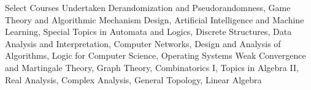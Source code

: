 \begin{rubric}{Select Courses Undertaken}
		Derandomization and Pseudorandomness, Game Theory and Algorithmic Mechanism Design, Artificial Intelligence and Machine Learning, Special Topics in Automata and Logics, Discrete Structures, Data Analysis and Interpretation, Computer Networks, Design and Analysis of Algorithms, Logic for Computer Science, Operating Systems
	\entry*[Mathematics]
		Weak Convergence and Martingale Theory, Graph Theory, Combinatorics I, Topics in Algebra II, Real Analysis, Complex Analysis, General Topology, Linear Algebra
\end{rubric}